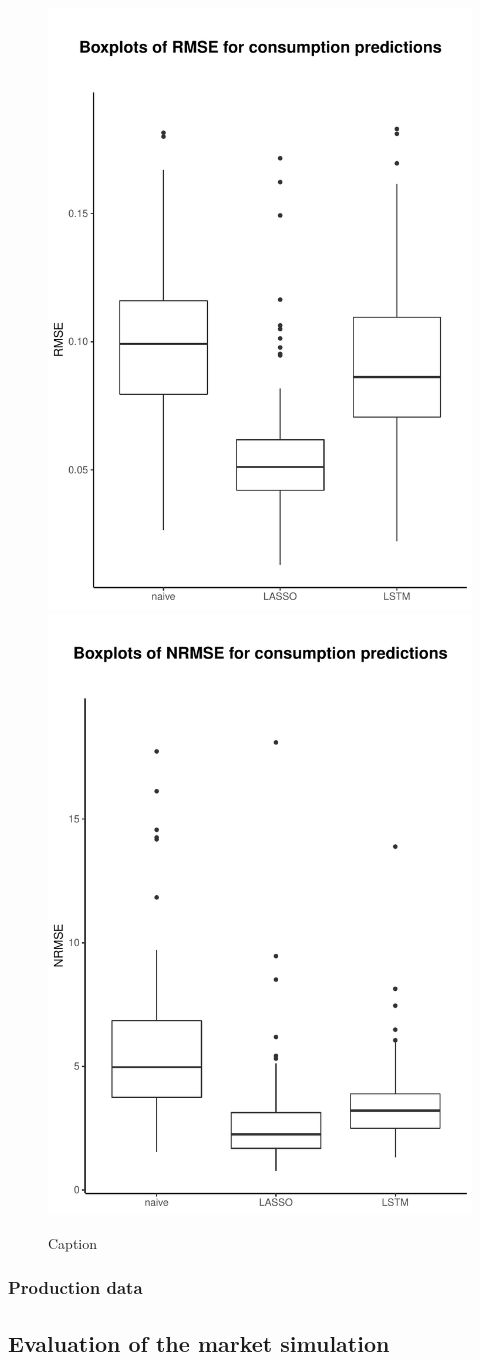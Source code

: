 \begin{figure}
    \includegraphics[width=.5\textwidth-0.15em]{thesis/graphs/evaluation/c_boxplot_RMSE.pdf}
    \includegraphics[width=.5\textwidth-0.15em]{thesis/graphs/evaluation/c_boxplot_NRMSE.pdf} \\
    \caption{Caption}
    \label{fig:my_label}
\end{figure}


\subsubsection{Production data}





\subsection{Evaluation of the market simulation}\label{Sec:Results;Subsec:Simulation}



